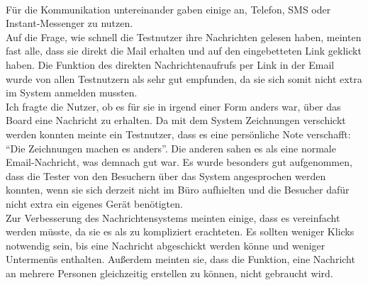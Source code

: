 \\
Für die Kommunikation untereinander gaben einige an, Telefon, SMS oder Instant-Messenger zu nutzen.
\\
Auf die Frage, wie schnell die Testnutzer ihre Nachrichten gelesen haben, meinten fast alle, dass sie direkt die Mail erhalten und auf den eingebetteten Link geklickt haben.
Die Funktion des direkten Nachrichtenaufrufs per Link in der Email wurde von allen Testnutzern als sehr gut empfunden, da sie sich somit nicht extra im System anmelden mussten.
\\
Ich fragte die Nutzer, ob es für sie in irgend einer Form anders war, über das Board eine Nachricht zu erhalten.
Da mit dem System Zeichnungen verschickt werden konnten meinte ein Testnutzer, dass es eine persönliche Note verschafft: ``Die Zeichnungen machen es anders''.
Die anderen sahen es als eine normale Email-Nachricht, was demnach gut war.
Es wurde besonders gut aufgenommen, dass die Tester von den Besuchern über das System angesprochen werden konnten, wenn sie sich derzeit nicht im Büro aufhielten und die Besucher dafür nicht extra ein eigenes Gerät benötigten.
\\
Zur Verbesserung des Nachrichtensystems meinten einige, dass es vereinfacht werden müsste, da sie es als zu kompliziert erachteten.
Es sollten weniger Klicks notwendig sein, bis eine Nachricht abgeschickt werden könne und weniger Untermenüs enthalten.
Außerdem meinten sie, dass die Funktion, eine Nachricht an mehrere Personen gleichzeitig erstellen zu können, nicht gebraucht wird.





